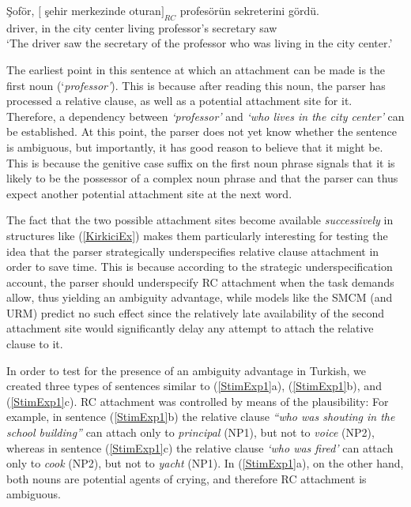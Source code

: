 \documentclass[english, doc]{apa7}\usepackage[]{graphicx}\usepackage[]{color}
\begin{document}
\begin{exe}
    \ex \label{KirkiciEx} 
\gll Şoför, $[${ şehir merkezinde} oturan$]_{RC}$ profesörün sekreterini gördü. \\
    driver,    {in the city center} living professor's secretary saw \\
    `The driver saw the secretary of the professor who was living in the city center.'
\end{exe}

The earliest point in this sentence at which an attachment can be made is the first noun (`\emph{professor'}). This is because after reading this noun, the parser has processed a relative clause, as well as a potential attachment site for it. Therefore, a dependency between \emph{`professor'} and \emph{`who lives in the city center'} can be established. At this point, the parser does not yet know whether the sentence is ambiguous, but importantly, it has good reason to believe that it might be. This is because the genitive case suffix on the first noun phrase signals that it is likely to be the possessor of a complex noun phrase and that the parser can thus expect another potential attachment site at the next word.

The fact that the two possible attachment sites become available \textit{successively} in structures like (\ref{KirkiciEx}) makes them particularly interesting for testing the idea that the parser strategically underspecifies relative clause attachment in order to save time. This is because according to the strategic underspecification account, the parser should underspecify RC attachment when the task demands allow, thus yielding an ambiguity advantage, while models like the SMCM (and URM) predict no such effect since the relatively late availability of the second attachment site would significantly delay any attempt to attach the relative clause to it.

In order to test for the presence of an ambiguity advantage in Turkish, we created three types of sentences similar to (\ref{StimExp1}a), (\ref{StimExp1}b), and (\ref{StimExp1}c). RC attachment was controlled by means of the plausibility:
For example, in sentence (\ref{StimExp1}b) the relative clause \textit{``who was shouting in the school building''} can attach only to \emph{principal} (NP1), but not to \emph{voice} (NP2), whereas in sentence (\ref{StimExp1}c) the relative clause \emph{`who was fired'} can attach only to \emph{cook} (NP2), but not to \emph{yacht} (NP1). In (\ref{StimExp1}a), on the other hand, both nouns are potential agents of crying, and therefore RC attachment is ambiguous.
\end{document}
